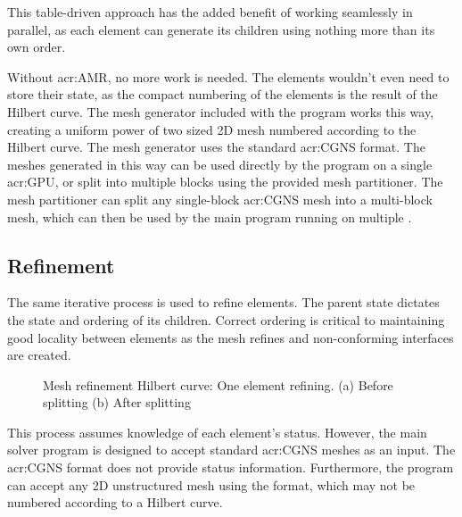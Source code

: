 This table-driven approach has the added benefit of working seamlessly in parallel, as each element
can generate its children using nothing more than its own order.

Without \acrlong{acr:AMR}, no more work is needed. The elements wouldn't even need to store their
state, as the compact numbering of the elements is the result of the Hilbert curve. The mesh
generator included with the program works this way, creating a uniform power of two sized 2D mesh
numbered according to the Hilbert curve. The mesh generator uses the standard \acrshort{acr:CGNS}
format. The meshes generated in this way can be used directly by the program on a single
\acrshort{acr:GPU}, or split into multiple blocks using the provided mesh partitioner. The mesh
partitioner can split any single-block \acrshort{acr:CGNS} mesh into a multi-block mesh, which can
then be used by the main program running on multiple .

\subsection{Refinement}\label{section:load_balancing:hilbert_curve:refinement}

The same iterative process is used to refine elements. The parent state dictates the state and
ordering of its children. Correct ordering is critical to maintaining good locality between elements
as the mesh refines and non-conforming interfaces are created.

\begin{figure}[H]
	\centering
	\hfill
	\caption{Mesh refinement Hilbert curve: One element refining. (a) Before splitting (b) After splitting}\label{fig:hilbert_refining}
\end{figure}

This process assumes knowledge of each element's status. However, the main solver program is
designed to accept standard \acrshort{acr:CGNS} meshes as an input. The \acrshort{acr:CGNS} format
does not provide status information. Furthermore, the program can accept any 2D unstructured mesh
using the format, which may not be numbered according to a Hilbert curve. 

